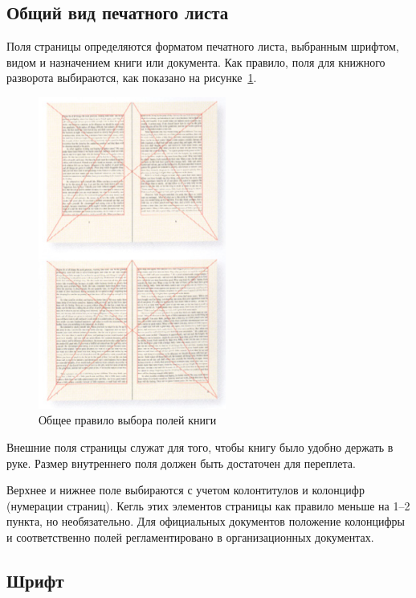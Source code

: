 \subsection{Общий вид печатного листа}

Поля страницы определяются форматом печатного листа, выбранным шрифтом, видом и назначением книги или документа. Как правило, поля для книжного разворота выбираются, как показано на рисунке~\ref{fig:margins}.

\begin{figure}[H]
	\centering
	\includegraphics[width=0.55\textwidth]{pics/margins.png}
	\caption{Общее правило выбора полей книги}
	\label{fig:margins}
\end{figure}

Внешние поля страницы служат для того, чтобы книгу было удобно держать в руке. Размер внутреннего поля должен быть достаточен для переплета.

Верхнее и нижнее поле выбираются с учетом колонтитулов и колонцифр (нумерации страниц). Кегль этих элементов страницы как правило меньше на 1--2 пункта, но необязательно\cite{author_manual}. Для официальных документов положение колонцифры и соответственно полей регламентировано в организационных документах.

\subsection{Шрифт}


